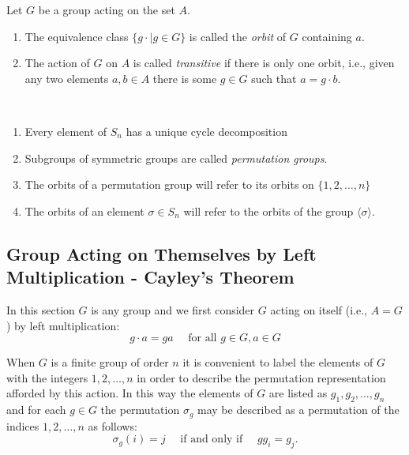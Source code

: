 \documentclass[../main]{subfiles}
\begin{document}
 
 \begin{dfn}
  Let $G$ be a group acting on the set $A$.
  \begin{enumerate}
   \item The equivalence class $\{g\cdot \mid g\in G\}$ is called the \textit{orbit} of $G$ containing $a$.
   \item The action of $G$ on $A$ is called \textit{transitive} if there is only one orbit, i.e., given any two elements $a,b\in A$ there is some $g\in G$ such that $a=g\cdot b$.
  \end{enumerate}
 \end{dfn}
 
 
 \begin{nt}
  ~\begin{enumerate}
    \item Every element of $S_n$ has a unique cycle decomposition
    \item Subgroups of symmetric groups are called \textit{permutation groups}.
    \item The orbits of a permutation group will refer to its orbits on $\{1,2,\ldots,n\}$
    \item The orbits of an element $\sigma \in S_n$ will refer to the orbits of the group $\langle \sigma \rangle$.
   \end{enumerate}
 \end{nt}
 
 
 \subsection{Group Acting on Themselves by Left Multiplication - Cayley's Theorem}
 

 \begin{nt}
  In this section $G$ is any group and we first consider $G$ acting on itself (i.e., $A=G$) by left multiplication:
  \[g \cdot a=g a \quad \text { for all } g \in G, a \in G\]

When $G$ is a finite group of order $n$ it is convenient to label the elements of $G$ with the integers $1,2, \ldots, n$ in order to describe the permutation representation afforded by this action. In this way the elements of $G$ are listed as $g_1, g_2, \ldots, g_n$ and for each $g \in G$ the permutation $\sigma_g$ may be described as a permutation of the indices $1,2, \ldots, n$ as follows:
\[\sigma_g(i)=j \quad \text { if and only if } \quad g g_i=g_j.\]
 \end{nt}
 
\end{document}
